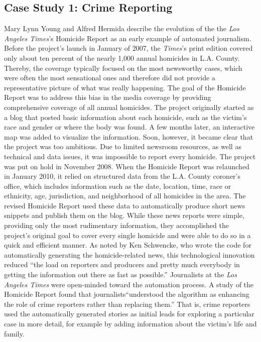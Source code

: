 \documentclass[notoc, symmetric, nobib, nols]{towcenter-guideto-book}
\begin{document}
\subsection{Case Study 1: Crime Reporting}

Mary Lynn Young and Alfred Hermida describe the evolution of the the \textit{Los Angeles Times}'s Homicide Report as an early example of automated journalism.\autocite{young15} Before the project's launch in January of 2007, the \textit{Times}'s print edition covered only about ten percent of the nearly 1,000 annual homicides in L.A. County. Thereby, the coverage typically focused on the most newsworthy cases, which were often the most sensational ones and therefore did not provide a representative picture of what was really happening. The goal of the Homicide Report was to address this bias in the media coverage by providing comprehensive coverage of all annual homicides. The project originally started as a blog that posted basic information about each homicide, such as the victim's race and gender or where the body was found. A few months later, an interactive map was added to visualize the information. Soon, however, it became clear that the project was too ambitious. Due to limited newsroom resources, as well as technical and data issues, it was impossible to report every homicide. The project was put on hold in November 2008. When the Homicide Report was relaunched in January 2010, it relied on structured data from the L.A. County coroner's office, which includes information such as the date, location, time, race or ethnicity, age, jurisdiction, and neighborhood of all homicides in the area. The revised Homicide Report used these data to automatically produce short news snippets and publish them on the blog. While these news reports were simple, providing only the most rudimentary information, they accomplished the project's original goal to cover every single homicide and were able to do so in a quick and efficient manner. As noted by Ken Schwencke, who wrote the code for automatically generating the homicide-related news, this technological innovation reduced ``the load on reporters and producers and pretty much everybody in getting the information out there as fast as possible.''\autocite{young15} Journalists at the \textit{Los Angeles Times} were open-minded toward the automation process. A study of the Homicide Report found that journalists``understood the algorithm as enhancing the role of crime reporters rather than replacing them.''\autocite{young15} That is, crime reporters used the automatically generated stories as initial leads for exploring a particular case in more detail, for example by adding information about the victim's life and family. 
\end{document}
